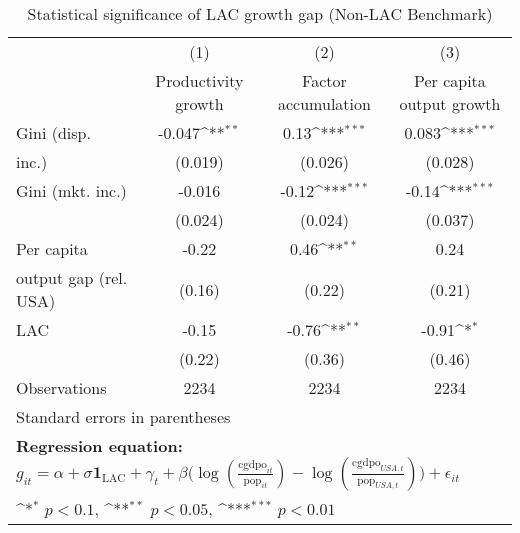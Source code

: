 \begin{table}[htbp]\centering
\def\sym#1{\ifmmode^{#1}\else\(^{#1}\)\fi}
\caption{Statistical significance of LAC growth gap (Non-LAC Benchmark)}
\begin{tabular}{l*{3}{c}}
\toprule
                &\multicolumn{1}{c}{(1)}&\multicolumn{1}{c}{(2)}&\multicolumn{1}{c}{(3)}\\
                &\multicolumn{1}{c}{Productivity growth}&\multicolumn{1}{c}{Factor accumulation}&\multicolumn{1}{c}{Per capita output growth}\\
\midrule
Gini (disp.     &   -0.047\sym{**} &     0.13\sym{***}&    0.083\sym{***}\\
inc.)           &  (0.019)         &  (0.026)         &  (0.028)         \\
\addlinespace
Gini (mkt. inc.)&   -0.016         &    -0.12\sym{***}&    -0.14\sym{***}\\
                &  (0.024)         &  (0.024)         &  (0.037)         \\
\addlinespace
Per capita      &    -0.22         &     0.46\sym{**} &     0.24         \\
output gap (rel. USA)&   (0.16)         &   (0.22)         &   (0.21)         \\
\addlinespace
LAC             &    -0.15         &    -0.76\sym{**} &    -0.91\sym{*}  \\
                &   (0.22)         &   (0.36)         &   (0.46)         \\
\midrule
Observations    &     2234         &     2234         &     2234         \\
\bottomrule
\multicolumn{4}{l}{\footnotesize Standard errors in parentheses}\\
\multicolumn{4}{l}{\footnotesize \textbf{Regression equation:} \(g_{it} = \alpha + \sigma \mathbf{1}_{\textrm{LAC}} + \gamma_t + \beta \big(\log (\frac{\textrm{cgdpo}_{it}}{\textrm{pop}_{it}} ) - \log (\frac{\textrm{cgdpo}_{USA,t}}{\textrm{pop}_{USA,t}}  ) \big) + \epsilon_{it}\)}\\
\multicolumn{4}{l}{\footnotesize \sym{*} \(p<0.1\), \sym{**} \(p<0.05\), \sym{***} \(p<0.01\)}\\
\end{tabular}
\end{table}
